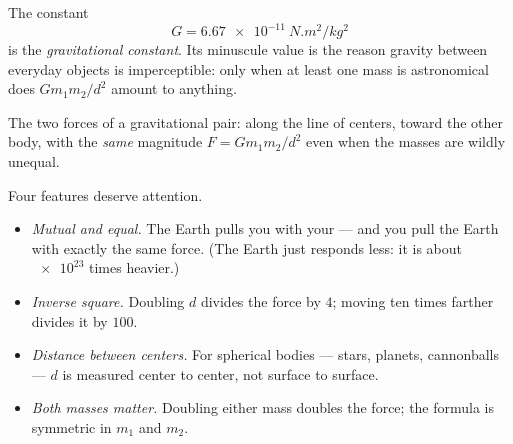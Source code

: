 \begin{definition}\label{def:g10:universal-gravitation:constant}
The constant
\[
G = \qty{6.67e-11}{N.m^2/kg^2}
\]
is the \emph{gravitational constant}. Its
minuscule value is the reason gravity between everyday objects is
imperceptible: only when at least one mass is astronomical does
$G m_1 m_2 / d^2$ amount to anything.
\end{definition}

\begin{omfigure}

{\small The two forces of a gravitational pair: along the line of
centers, toward the other body, with the \emph{same} magnitude
$F = G m_1 m_2 / d^2$ even when the masses are wildly unequal.}
\end{omfigure}

\begin{remark}\label{rem:g10:universal-gravitation:reading}
Four features deserve attention.
\begin{itemize}
  \item \emph{Mutual and equal.} The Earth pulls you with your 
        --- and you pull the Earth with exactly the same force. (The
        Earth just responds less: it is about $\num{e23}$ times
        heavier.)
  \item \emph{Inverse square.} Doubling $d$ divides the force by $4$;
        moving ten times farther divides it by $100$.
  \item \emph{Distance between centers.} For spherical bodies --- stars,
        planets, cannonballs --- $d$ is measured center to center, not
        surface to surface.
  \item \emph{Both masses matter.} Doubling either mass doubles the
        force; the formula is symmetric in $m_1$ and $m_2$.
\end{itemize}
\end{remark}

